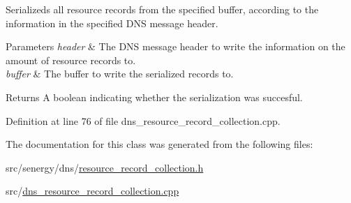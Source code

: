 Serializeds all resource records from the specified buffer, according to the information in the specified D\-N\-S message header. 


\begin{DoxyParams}{Parameters}
{\em header} & The D\-N\-S message header to write the information on the amount of resource records to. \\
\hline
{\em buffer} & The buffer to write the serialized records to.\\
\hline
\end{DoxyParams}
\begin{DoxyReturn}{Returns}
A boolean indicating whether the serialization was succesful. 
\end{DoxyReturn}


Definition at line 76 of file dns\-\_\-resource\-\_\-record\-\_\-collection.\-cpp.



The documentation for this class was generated from the following files\-:\begin{DoxyCompactItemize}
\item 
src/senergy/dns/\hyperlink{resource__record__collection_8h}{resource\-\_\-record\-\_\-collection.\-h}\item 
src/\hyperlink{dns__resource__record__collection_8cpp}{dns\-\_\-resource\-\_\-record\-\_\-collection.\-cpp}\end{DoxyCompactItemize}
